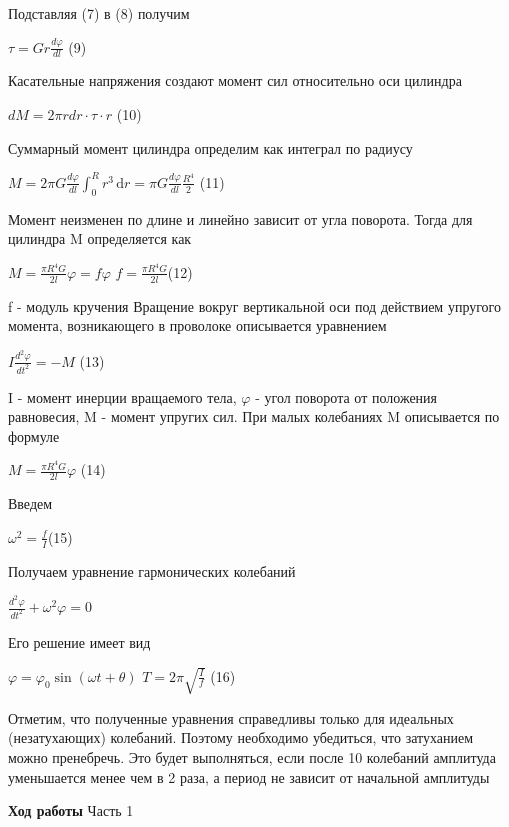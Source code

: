\documentclass[12pt,a4paper]{article}
\begin{document}
{Подставляя (7) в (8) получим}
\begin{center}
\large $\tau=Gr\frac{d\varphi}{dl}$ (9)
\end{center}
{Касательные напряжения создают момент сил относительно оси цилиндра}
\begin{center}
\large $dM=2\pi{rdr}\cdot{\tau}\cdot{r}$ (10)
\end{center}
{Суммарный момент цилиндра определим как интеграл по радиусу}
\begin{center}
\large $M=2\pi{G}\frac{d\varphi}{dl}\int_0^R r^3\,\mathrm{d}r=\pi{G}\frac{d\varphi}{dl}\frac{R^4}{2}$ (11)
\end{center}
{Момент неизменен по длине и линейно зависит от угла поворота. Тогда для цилиндра M определяется как}
\begin{center}
\large $M=\frac{\pi{R^4G}}{2l}\varphi=f\varphi$ \;\;\;\;\;\;\; $f=\frac{\pi{R^4}G}{2l}$(12)
\end{center}
{f - модуль кручения}
{Вращение вокруг вертикальной оси под действием упругого момента, возникающего в проволоке описывается уравнением}
\begin{center}
\large $I\frac{d^2\varphi}{dt^2}=-M$ (13)
\end{center}
{I - момент инерции вращаемого тела, $\varphi$ - угол поворота от положения равновесия, M - момент упругих сил. При малых колебаниях M описывается по формуле}
\begin{center}
\large $M=\frac{\pi{R^4G}}{2l}\varphi$ (14)
\end{center}
{Введем}
\begin{center}
\large $\omega^2=\frac{f}{I}$(15)
\end{center}
{Получаем уравнение гармонических колебаний}
\begin{center}
\large $\frac{d^2\varphi}{dt^2}+\omega^2\varphi=0$
\end{center}
{Его решение имеет вид}
\begin{center}
\large $\varphi=\varphi_{0}\sin(\omega{t}+\theta)$ \;\;\;\;\;\;\; $T=2\pi{\sqrt{\frac{I}{f}}}$ (16)
\end{center}
\begin{par}
{Отметим, что полученные уравнения справедливы только для идеальных (незатухающих) колебаний. Поэтому необходимо убедиться, что затуханием можно пренебречь. Это будет выполняться, если после 10 колебаний амплитуда уменьшается менее чем в 2 раза, а период не зависит от начальной амплитуды}
\end{par}
\newpage
\begin{center}
\large {\bf Ход работы}\break
Часть 1
\end{center}
\end{document}
